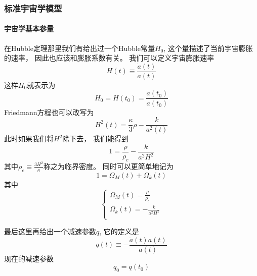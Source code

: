 \documentclass[8pt]{beamer}
\begin{document}
        \begin{frame}[fragile]
            \frametitle{标准宇宙学模型}
            \framesubtitle{宇宙学基本参量}
            \begin{multicols}{2} 
                \qquad
                在Hubble定理那里我们有给出过一个Hubble常量$H_0$,
                这个量描述了当前宇宙膨胀的速率，
                因此也应该和膨胀系数有关。
                我们可以定义宇宙膨胀速率
                $$H(t)\equiv\frac{\dot{a}(t)}{a(t)}$$
                这样$H_0$就表示为
                $$H_0=H(t_0)=\frac{\dot{a}(t_0)}{a(t_0)}$$
                Friedmann方程也可以改写为
                $$H^2(t)=\frac{\kappa }{3}\rho -\frac{k}{a^2(t)}$$
                此时如果我们将$H^2$除下去，
                我们能得到
                $$1=\frac{\rho}{\rho_c} -\frac{k}{a^2H^2}$$
                其中$\rho_c\equiv\frac{3H^2}{\kappa }$称之为临界密度。
                同时可以更简单地记为
                $$1=\Omega_M(t)+\Omega_k(t)$$
                其中
                $$
                \begin{cases} 
                    \Omega_M(t)=\frac{\rho}{\rho_c}\\ 
                    \Omega_k(t)=-\frac{k}{a^2H^2}\\
                \end{cases}
                $$

                \qquad
                最后这里再给出一个减速参数$q$,
                它的定义是
                $$q(t)\equiv -\frac{\ddot{a}(t)a(t)}{\dot{a}(t)}$$
                现在的减速参数$$q_0=q(t_0)$$
            \end{multicols}
        \end{frame}
    
\end{document}
